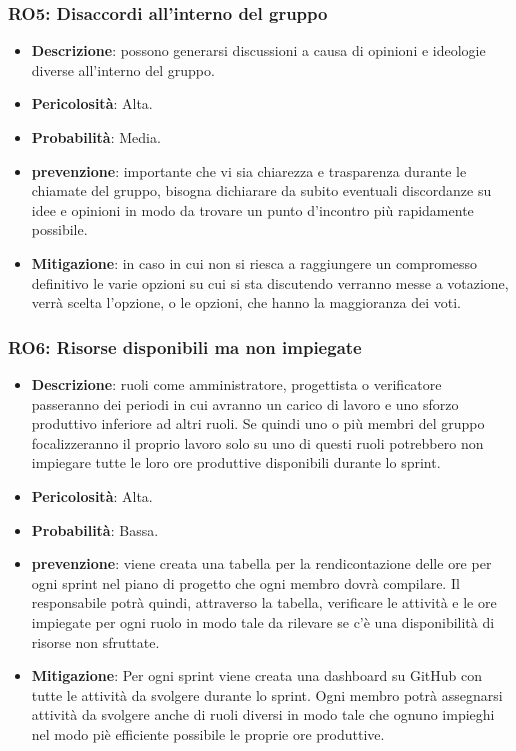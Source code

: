 \subsubsection{RO5: Disaccordi all'interno del gruppo}
\begin{itemize}
    \item \textbf{Descrizione}: possono generarsi discussioni a causa di opinioni e ideologie diverse all'interno del gruppo.
    \item \textbf{Pericolosità}: Alta.
    \item \textbf{Probabilità}: Media.
    \item \textbf{prevenzione}: importante che vi sia chiarezza e trasparenza durante le chiamate del gruppo, bisogna dichiarare da subito eventuali discordanze su idee e opinioni in modo da trovare un punto d'incontro più rapidamente possibile.
    \item \textbf{Mitigazione}: in caso in cui non si riesca a raggiungere un compromesso definitivo le varie opzioni su cui si sta discutendo verranno messe a votazione, verrà scelta l'opzione, o le opzioni, che hanno la maggioranza dei voti. 
\end{itemize}

\subsubsection{RO6: Risorse disponibili ma non impiegate}
\begin{itemize}
    \item \textbf{Descrizione}: ruoli come amministratore, progettista o verificatore passeranno dei periodi in cui avranno un carico di lavoro e uno sforzo produttivo inferiore ad altri ruoli. 
    Se quindi uno o più membri del gruppo focalizzeranno il proprio lavoro solo su uno di questi ruoli potrebbero non impiegare tutte le loro ore produttive disponibili durante lo sprint.
    \item \textbf{Pericolosità}: Alta.
    \item \textbf{Probabilità}: Bassa.
    \item \textbf{prevenzione}: viene creata una tabella per la rendicontazione delle ore per ogni sprint nel piano di progetto che ogni membro dovrà compilare.
    Il responsabile potrà quindi, attraverso la tabella, verificare le attività e le ore impiegate per ogni ruolo in modo tale da rilevare se c'è una disponibilità di risorse non sfruttate.
    \item \textbf{Mitigazione}:  Per ogni sprint viene creata una dashboard su GitHub con tutte le attività da svolgere durante lo sprint.
    Ogni membro potrà assegnarsi attività da svolgere anche di ruoli diversi in modo tale che ognuno impieghi nel modo piè efficiente possibile le proprie ore produttive.
\end{itemize}